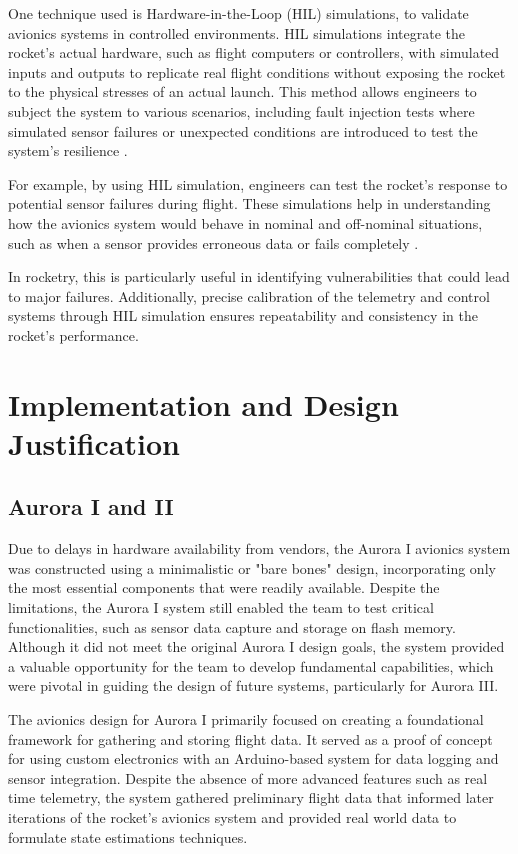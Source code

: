 One technique used is Hardware-in-the-Loop (HIL) simulations, to validate avionics systems in controlled environments. HIL simulations integrate the rocket's actual hardware, such as flight computers or controllers, with simulated inputs and outputs to replicate real flight conditions without exposing the rocket to the physical stresses of an actual launch. This method allows engineers to subject the system to various scenarios, including fault injection tests where simulated sensor failures or unexpected conditions are introduced to test the system’s resilience \cite{HIL_rocket, HIL}. 

For example, by using HIL simulation, engineers can test the rocket's response to potential sensor failures during flight. These simulations help in understanding how the avionics system would behave in nominal and off-nominal situations, such as when a sensor provides erroneous data or fails completely \cite{HIL_rocket}. 

In rocketry, this is particularly useful in identifying vulnerabilities that could lead to major failures. Additionally, precise calibration of the telemetry and control systems through HIL simulation ensures repeatability and consistency in the rocket's performance.

\section{Implementation and Design Justification}
\subsection{Aurora I and II}
Due to delays in hardware availability from vendors, the Aurora I avionics system was constructed using a minimalistic or "bare bones" design, incorporating only the most essential components that were readily available. Despite the limitations, the Aurora I system still enabled the team to test critical functionalities, such as sensor data capture and storage on flash memory. Although it did not meet the original Aurora I design goals, the system provided a valuable opportunity for the team to develop fundamental capabilities, which were pivotal in guiding the design of future systems, particularly for Aurora III. 

The avionics design for Aurora I primarily focused on creating a foundational framework for gathering and storing flight data. It served as a proof of concept for using custom electronics with an Arduino-based system for data logging and sensor integration. Despite the absence of more advanced features such as real time telemetry, the system gathered preliminary flight data that informed later iterations of the rocket's avionics system and provided real world data to formulate state estimations techniques.  

